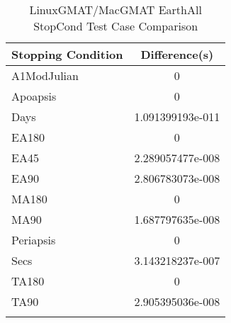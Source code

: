 \begin{table}[htbp!]
\centering
\caption{ LinuxGMAT/MacGMAT EarthAll StopCond Test Case Comparison}
      \begin{tabular}{lc}
      \hline\hline
          Stopping Condition & Difference(s) \\
         \hline
         A1ModJulian & 0 \\
         Apoapsis & 0 \\
         Days & 1.091399193e-011 \\
         EA180 & 0 \\
         EA45 & 2.289057477e-008 \\
         EA90 & 2.806783073e-008 \\
         MA180 & 0 \\
         MA90 & 1.687797635e-008 \\
         Periapsis & 0 \\
         Secs & 3.143218237e-007 \\
         TA180 & 0 \\
         TA90 & 2.905395036e-008 \\
      \hline\hline
      \label{Table: LinuxGMAT-MacGMAT EarthAll StopCond Table} 
\end{tabular}
\end{table}
